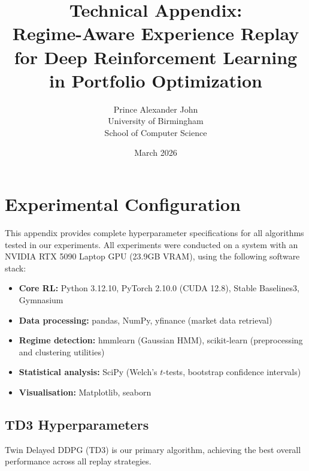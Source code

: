 \documentclass[11pt,a4paper]{article}
\title{Technical Appendix:\\Regime-Aware Experience Replay for Deep Reinforcement Learning in Portfolio Optimization}
\author{Prince Alexander John \\ University of Birmingham \\ School of Computer Science}
\date{March 2026}
\begin{document}
\maketitle

\tableofcontents
\newpage

\appendix

\section{Experimental Configuration}
\label{app:config}

This appendix provides complete hyperparameter specifications for all algorithms tested in our experiments. All experiments were conducted on a system with an NVIDIA RTX 5090 Laptop GPU (23.9GB VRAM), using the following software stack:

\begin{itemize}
    \item \textbf{Core RL:} Python 3.12.10, PyTorch 2.10.0 (CUDA 12.8), Stable Baselines3, Gymnasium
    \item \textbf{Data processing:} pandas, NumPy, yfinance (market data retrieval)
    \item \textbf{Regime detection:} hmmlearn (Gaussian HMM), scikit-learn (preprocessing and clustering utilities)
    \item \textbf{Statistical analysis:} SciPy (Welch's $t$-tests, bootstrap confidence intervals)
    \item \textbf{Visualisation:} Matplotlib, seaborn
\end{itemize}

\subsection{TD3 Hyperparameters}

Twin Delayed DDPG (TD3) is our primary algorithm, achieving the best overall performance across all replay strategies.
\end{document}
